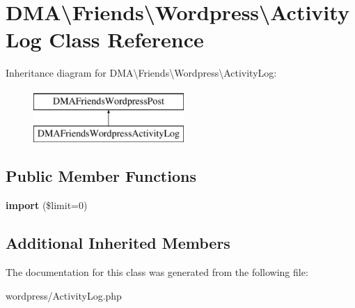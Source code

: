 \hypertarget{classDMA_1_1Friends_1_1Wordpress_1_1ActivityLog}{\section{D\-M\-A\textbackslash{}Friends\textbackslash{}Wordpress\textbackslash{}Activity\-Log Class Reference}
\label{classDMA_1_1Friends_1_1Wordpress_1_1ActivityLog}
}
Inheritance diagram for D\-M\-A\textbackslash{}Friends\textbackslash{}Wordpress\textbackslash{}Activity\-Log\-:\begin{figure}[H]
\begin{center}
\leavevmode
\includegraphics[height=2.000000cm]{d3/d37/classDMA_1_1Friends_1_1Wordpress_1_1ActivityLog}
\end{center}
\end{figure}
\subsection*{Public Member Functions}
\begin{DoxyCompactItemize}
\item 
\hypertarget{classDMA_1_1Friends_1_1Wordpress_1_1ActivityLog_a51567d47aa076394d865e890747f9832}{{\bfseries import} (\$limit=0)}\label{classDMA_1_1Friends_1_1Wordpress_1_1ActivityLog_a51567d47aa076394d865e890747f9832}

\end{DoxyCompactItemize}
\subsection*{Additional Inherited Members}


The documentation for this class was generated from the following file\-:\begin{DoxyCompactItemize}
\item 
wordpress/Activity\-Log.\-php\end{DoxyCompactItemize}
